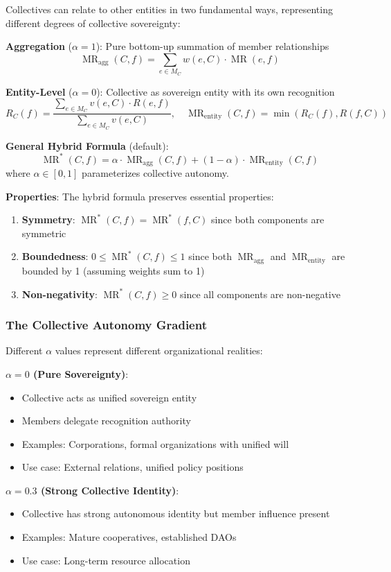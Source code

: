 \documentclass[11pt,a4paper]{article}
\theoremstyle{definition}
\theoremstyle{remark}
\DeclareMathOperator{\MR}{MR}
\begin{document}
Collectives can relate to other entities in two fundamental ways, representing different degrees of collective sovereignty:

\textbf{Aggregation} ($\alpha = 1$): Pure bottom-up summation of member relationships
\[ \MR_{\text{agg}}(C, f) = \sum_{e \in M_C} w(e, C) \cdot \MR(e, f) \]

\textbf{Entity-Level} ($\alpha = 0$): Collective as sovereign entity with its own recognition
\[ R_C(f) = \frac{\sum_{e \in M_C} v(e, C) \cdot R(e, f)}{\sum_{e \in M_C} v(e, C)}, \quad \MR_{\text{entity}}(C, f) = \min(R_C(f), R(f, C)) \]

\textbf{General Hybrid Formula} (default):
\[ \MR^*(C,f) = \alpha \cdot \MR_{\text{agg}}(C,f) + (1-\alpha) \cdot \MR_{\text{entity}}(C,f) \]
where $\alpha \in [0,1]$ parameterizes collective autonomy.

\textbf{Properties}: The hybrid formula preserves essential properties:
\begin{enumerate}
\item \textbf{Symmetry}: $\MR^*(C,f) = \MR^*(f,C)$ since both components are symmetric
\item \textbf{Boundedness}: $0 \le \MR^*(C,f) \le 1$ since both $\MR_{\text{agg}}$ and $\MR_{\text{entity}}$ are bounded by 1 (assuming weights sum to 1)
\item \textbf{Non-negativity}: $\MR^*(C,f) \ge 0$ since all components are non-negative
\end{enumerate}

\subsubsection{The Collective Autonomy Gradient}

Different $\alpha$ values represent different organizational realities:

\textbf{$\alpha = 0$ (Pure Sovereignty)}:
\begin{itemize}
\item Collective acts as unified sovereign entity
\item Members delegate recognition authority
\item Examples: Corporations, formal organizations with unified will
\item Use case: External relations, unified policy positions
\end{itemize}

\textbf{$\alpha = 0.3$ (Strong Collective Identity)}:
\begin{itemize}
\item Collective has strong autonomous identity but member influence present
\item Examples: Mature cooperatives, established DAOs
\item Use case: Long-term resource allocation
\end{itemize}
\end{document}
